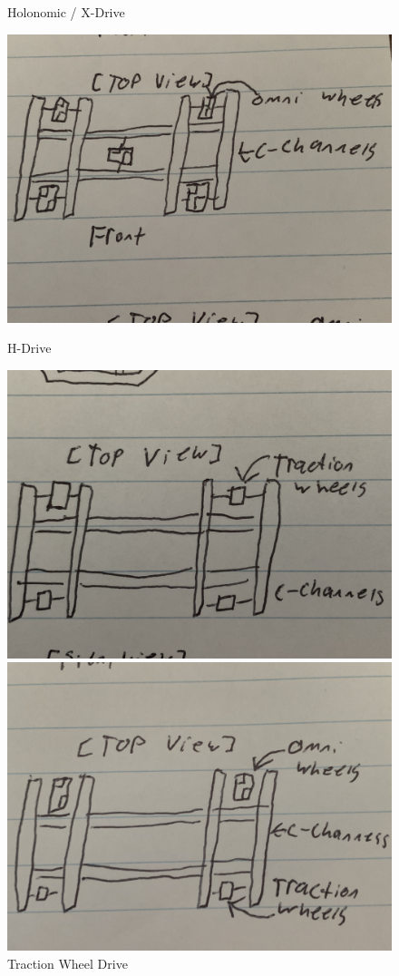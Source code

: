 \begin{figure}[hbt!]
\begin{minipage}{.5\textwidth}
        \caption{Holonomic / X-Drive}
        \label{fig:hexagonal}
    \end{minipage}%
    \begin{minipage}{.5\textwidth}
        \centering
        \includegraphics[width=.8\linewidth]{images/5 Omni Wheels.jpg}
        \caption{H-Drive}
        \label{fig:h-drive}
    \end{minipage}
    \begin{minipage}{.5\textwidth}
        \centering
        \includegraphics[width=.8\linewidth]{images/Traction Wheel Drive.jpg}
        \caption{Traction Wheel Drive}
        \label{fig:traction-wheel-drive}
    \end{minipage}%
    \begin{minipage}{.5\textwidth}
        \centering
        \includegraphics[width=.8\linewidth]{images/Omni and Traction Wheel Drive.jpg}

\end{minipage}
\end{figure}
